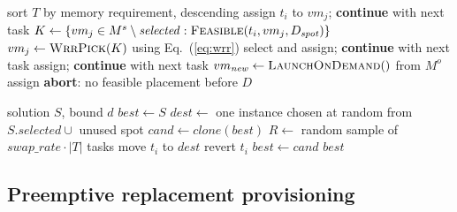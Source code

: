 \documentclass[conference]{IEEEtran}
\begin{document}
\begin{algorithm}[t]
\caption{\textsc{GreedyInitial}: initial solution. Inherited from Burst-HADS~\cite{bursthads}.}
\label{alg:greedy}
\begin{algorithmic}[1]
\STATE sort $T$ by memory requirement, descending
      \STATE assign $t_i$ to $vm_j$; \textbf{continue} with next task
    \ENDIF
  \ENDFOR
  \STATE $K \leftarrow \{vm_j \in M^{s}\setminus \mathit{selected} : \textsc{Feasible}(t_i,vm_j,D_{\mathit{spot}})\}$
  \STATE $vm_j \leftarrow \textsc{WrrPick}(K)$ using Eq.~(\ref{eq:wrr})
    \STATE select and assign; \textbf{continue} with next task
  \ENDIF
      \STATE assign; \textbf{continue} with next task
    \ENDIF
  \ENDFOR
  \STATE $vm_{\mathit{new}} \leftarrow \textsc{LaunchOnDemand}()$ from $M^{o}$
    \STATE assign
  \ELSE
    \STATE \textbf{abort}: no feasible placement before $D$
  \ENDIF
\ENDFOR
\end{algorithmic}
\end{algorithm}

\begin{algorithm}[t]
\caption{\textsc{LocalSearch}. Inherited from Burst-HADS~\cite{bursthads}.}
\label{alg:ls}
\begin{algorithmic}[1]
\REQUIRE solution $S$, bound $d$
\STATE $\mathit{best} \leftarrow S$
\STATE $\mathit{dest} \leftarrow$ one instance chosen at random from $S.\mathit{selected}\cup$ unused spot
  \STATE $\mathit{cand} \leftarrow \mathit{clone}(\mathit{best})$
  \STATE $R \leftarrow$ random sample of $\mathit{swap\_rate}\cdot|T|$ tasks
      \STATE move $t_i$ to $\mathit{dest}$
    \ELSE
      \STATE revert $t_i$
    \ENDIF
  \ENDFOR
    \STATE $\mathit{best} \leftarrow \mathit{cand}$
  \ENDIF
\ENDFOR
\RETURN $\mathit{best}$
\end{algorithmic}
\end{algorithm}

\subsection{Preemptive replacement provisioning}
\end{document}
